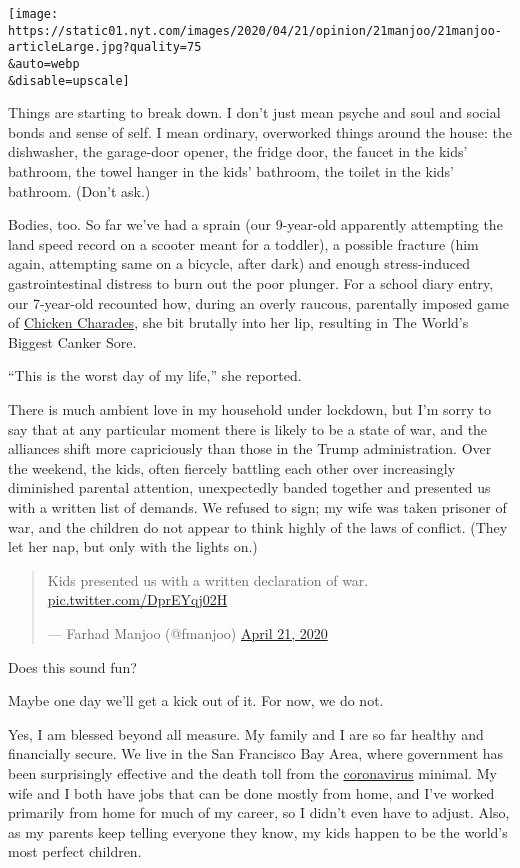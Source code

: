 \texttt{[image: https://static01.nyt.com/images/2020/04/21/opinion/21manjoo/21manjoo-articleLarge.jpg?quality=75\\\&auto=webp\\\&disable=upscale]}

Things are starting to break down. I don't just mean psyche and soul and
social bonds and sense of self. I mean ordinary, overworked things
around the house: the dishwasher, the garage-door opener, the fridge
door, the faucet in the kids' bathroom, the towel hanger in the kids'
bathroom, the toilet in the kids' bathroom. (Don't ask.)

Bodies, too. So far we've had a sprain (our 9-year-old apparently
attempting the land speed record on a scooter meant for a toddler), a
possible fracture (him again, attempting same on a bicycle, after dark)
and enough stress-induced gastrointestinal distress to burn out the poor
plunger. For a school diary entry, our 7-year-old recounted how, during
an overly raucous, parentally imposed game of
\href{https://youtu.be/h2gaHOLu4tI}{Chicken Charades}, she bit brutally
into her lip, resulting in The World's Biggest Canker Sore.

``This is the worst day of my life,'' she reported.

There is much ambient love in my household under lockdown, but I'm sorry
to say that at any particular moment there is likely to be a state of
war, and the alliances shift more capriciously than those in the Trump
administration. Over the weekend, the kids, often fiercely battling each
other over increasingly diminished parental attention, unexpectedly
banded together and presented us with a written list of demands. We
refused to sign; my wife was taken prisoner of war, and the children do
not appear to think highly of the laws of conflict. (They let her nap,
but only with the lights on.)

\begin{quote}
Kids presented us with a written declaration of war.
\href{https://t.co/DprEYqj02H}{pic.twitter.com/DprEYqj02H}

--- Farhad Manjoo (@fmanjoo)
\href{https://twitter.com/fmanjoo/status/1252685070806048768?ref_src=twsrc\%5Etfw}{April
21, 2020}
\end{quote}

Does this sound fun?

Maybe one day we'll get a kick out of it. For now, we do not.

Yes, I am blessed beyond all measure. My family and I are so far healthy
and financially secure. We live in the San Francisco Bay Area, where
government has been surprisingly effective and the death toll from the
\href{https://www.nytimes.com/2020/06/17/parenting/public-toilets-virus-kids.html}{coronavirus}
minimal. My wife and I both have jobs that can be done mostly from home,
and I've worked primarily from home for much of my career, so I didn't
even have to adjust. Also, as my parents keep telling everyone they
know, my kids happen to be the world's most perfect children.

